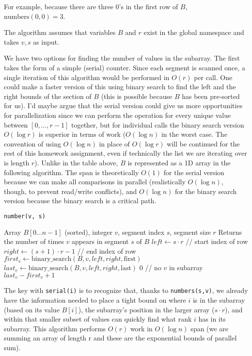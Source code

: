 \documentclass[11pt]{article}
\theoremstyle{definition}
\begin{document}
For example, because there are three 0's in the first row of $B$, $\text{numbers}(0,0) = 3$.

The algorithm assumes that variables $B$ and $r$ exist in the global namespace and takes $v, s$ as input. 

We have two options for finding the number of values in the subarray. The first takes the form of a simple (serial) counter. Since each segment is scanned once, a single iteration of this algorithm would be performed in $O(r)$ per call. One could make a faster version of this using binary search to find the left and the right bounds of the section of $B$ (this is possible because $B$ has been pre-sorted for us). I'd maybe argue that the serial version could give us more opportunities for parallelization since we can perform the operation for every unique value between $[0,\ldots,r-1]$ together, but for individual calls the binary search version $O(\log r)$ is superior in terms of work ($O(\log n)$ in the worst case. The convention of using $O(\log n)$ in place of $O(\log r)$ will be continued for the rest of this homework assignment, even if technically the list we are iterating over is length $r$). Unlike in the table above, $B$ is represented as a 1D array in the following algorithm. The span is theoretically $O(1)$ for the serial version because we can make all comparisons in parallel (realistically $O(\log n)$, though, to prevent read/write conflicts), and $O(\log n)$ for the binary search version because the binary search is a critical path.

\begin{algorithm}[H]
\caption{\texttt{number(v, s)}}
\begin{algorithmic}[1]
\REQUIRE Array $B[0 \ldots n-1]$ (sorted), integer $v$, segment index $s$, segment size $r$
\ENSURE Returns the number of times $v$ appears in segment $s$ of $B$
\STATE $left \gets s \cdot r$ \hfill // start index of row
\STATE $right \gets (s+1) \cdot r - 1$ \hfill // end index of row 
\STATE $first_v \gets \text{binary\_search}(B, v, left, right, \text{first})$
\STATE $last_v \gets \text{binary\_search}(B, v, left, right, \text{last})$
    \RETURN $0$ \hfill // no $v$ in subarray
\ENDIF
\RETURN $last_v - first_v + 1$
\end{algorithmic}
\end{algorithm}

The key with \texttt{serial(i)} is to recognize that, thanks to \texttt{numbers(s,v)}, we already have the information needed to place a tight bound on where $i$ is in the subarray (based on its value $B[i]$), the subarray's position in the larger array ($s \cdot r$), and within that smaller subset of values can quickly find what rank $i$ has in its subarray. This algorithm performs $O(r)$ work in $O(\log n)$ span (we are summing an array of length r and these are the exponential bounds of parallel sum).
\end{document}
